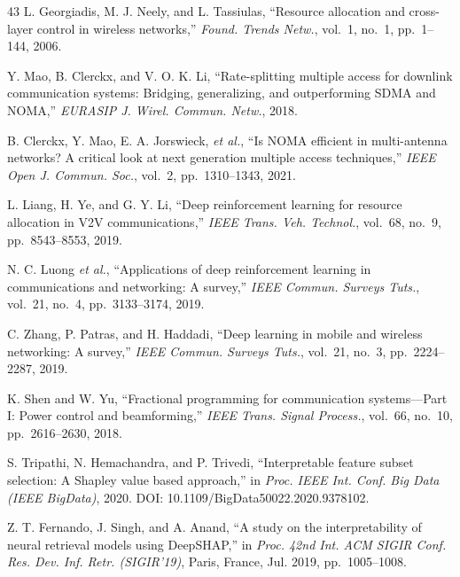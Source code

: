 \documentclass[journal]{IEEEtran}
\begin{document}
\begin{thebibliography}{43}
L. Georgiadis, M. J. Neely, and L. Tassiulas, ``Resource allocation and cross-layer control in wireless networks,'' \emph{Found. Trends Netw.}, vol.~1, no.~1, pp.~1--144, 2006.

Y. Mao, B. Clerckx, and V. O. K. Li, ``Rate-splitting multiple access for downlink communication systems: Bridging, generalizing, and outperforming SDMA and NOMA,'' \emph{EURASIP J. Wirel. Commun. Netw.}, 2018.

B. Clerckx, Y. Mao, E. A. Jorswieck, \emph{et al.}, ``Is NOMA efficient in multi-antenna networks? A critical look at next generation multiple access techniques,'' \emph{IEEE Open J. Commun. Soc.}, vol.~2, pp.~1310--1343, 2021.

L. Liang, H. Ye, and G. Y. Li, ``Deep reinforcement learning for resource allocation in V2V communications,'' \emph{IEEE Trans. Veh. Technol.}, vol.~68, no.~9, pp.~8543--8553, 2019.

N. C. Luong \emph{et al.}, ``Applications of deep reinforcement learning in communications and networking: A survey,'' \emph{IEEE Commun. Surveys Tuts.}, vol.~21, no.~4, pp.~3133--3174, 2019.

C. Zhang, P. Patras, and H. Haddadi, ``Deep learning in mobile and wireless networking: A survey,'' \emph{IEEE Commun. Surveys Tuts.}, vol.~21, no.~3, pp.~2224--2287, 2019.

K. Shen and W. Yu, ``Fractional programming for communication systems---Part I: Power control and beamforming,'' \emph{IEEE Trans. Signal Process.}, vol.~66, no.~10, pp.~2616--2630, 2018.

S. Tripathi, N. Hemachandra, and P. Trivedi, ``Interpretable feature subset selection: A Shapley value based approach,'' in \emph{Proc. IEEE Int. Conf. Big Data (IEEE BigData)}, 2020. DOI: 10.1109/BigData50022.2020.9378102.

Z. T. Fernando, J. Singh, and A. Anand, ``A study on the interpretability of neural retrieval models using DeepSHAP,'' in \emph{Proc. 42nd Int. ACM SIGIR Conf. Res. Dev. Inf. Retr. (SIGIR'19)}, Paris, France, Jul. 2019, pp.~1005--1008.

\end{thebibliography}
\end{document}

